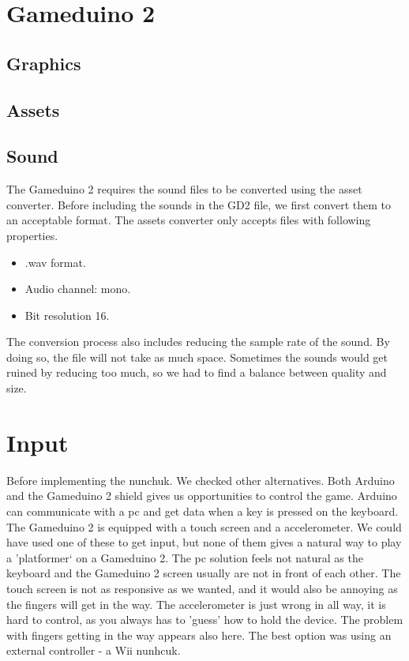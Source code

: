 \section{Gameduino 2}
\subsection{Graphics}
\subsection{Assets}
\subsection{Sound}
The Gameduino 2 requires the sound files to be converted using the asset converter. Before including the
sounds in the GD2 file, we first convert them to an acceptable format. The assets converter only accepts
files with following properties.

\begin{itemize}
  \item .wav format.
  \item Audio channel: mono.
  \item Bit resolution 16.
\end{itemize}

The conversion process also includes reducing the sample rate of the sound. By doing so,
the file will not take as much space. Sometimes the sounds would get ruined by reducing too much,
so we had to find a balance between quality and size.

\section{Input}
Before implementing the nunchuk. We checked other alternatives.
Both Arduino and the Gameduino 2 shield gives us opportunities to control the game.
Arduino can communicate with a pc and get data when a key is pressed on the keyboard.
The Gameduino 2 is equipped with a touch screen and a accelerometer. We could have used
one of these to get input, but none of them
gives a natural way to play a 'platformer` on a Gameduino 2. The pc solution
feels not natural as the keyboard and the Gameduino 2 screen usually are not in front of each other.
The touch screen is not as responsive as we wanted, and it would also be annoying
as the fingers will get in the way. The accelerometer is just wrong in all way, it is hard
to control, as you always has to 'guess' how to hold the device. The problem with fingers
getting in the way appears also here. The best option was using an external controller - a Wii nunhcuk.


